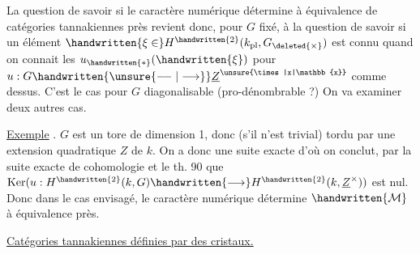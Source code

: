 La question de savoir si le caractère numérique détermine à équivalence de catégories tannakiennes près revient donc, pour $G$ fixé, à la question de savoir si un élément  $\handwritten{\xi\in}H^{\handwritten{2}}(k_{\mathrm{pl}},G_{\deleted{\times}})$ est connu quand on connait les $u_{\handwritten{*}}(\handwritten{\xi})$ pour $u:G\handwritten{\unsure{\mathrel{-\! -}|\longrightarrow}}\underline{Z}^{\unsure{\times|x|\mathbb{x}}}$ comme dessus.  C'est le cas pour $G$ diagonalisable  (pro-dénombrable ?) On va examiner deux autres cas.

\uline{Exemple} . $G$ est un tore de dimension 1, donc (s'il n'est trivial) tordu par une extension quadratique $Z$ de $k$. On a donc une suite exacte
d'où on conclut, par la suite exacte de cohomologie et le th. 90 que $\operatorname{Ker}(u:H^{\handwritten{2}}(k,G)\handwritten{\longrightarrow}H^{\handwritten{2}}(k,\underline{Z}^{\times}))$ est nul. Donc dans le cas envisagé, le caractère numérique détermine $\handwritten{\mathcal{M}}$ à équivalence près.

\uline{Catégories tannakiennes définies par des cristaux.}

